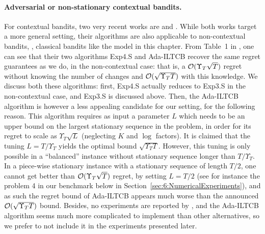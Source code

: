 \paragraph{Adversarial or non-stationary contextual bandits.}
%
For contextual bandits, two very recent works are \cite{Luo18} and \cite{ChenLeeLuoWei2019}.
While both works target a more general setting, their algorithms are also applicable to non-contextual bandits, \ie, classical bandits like the model in this chapter.
From Table~1 in \cite{Luo18}, one can see that their two algorithms Exp4.S and Ada-ILTCB recover the same regret guarantees as we do, in the non-contextual case:
that is, a $\mathcal{O}(\Upsilon_T \sqrt{T})$ regret without knowing the number of changes and $\mathcal{O}(\sqrt{\Upsilon_T T})$ with this knowledge.
We discuss both these algorithms:
%
first, Exp4.S actually reduces to Exp3.S in the non-contextual case, and Exp3.S is discussed above.
%
Then, the Ada-ILTCB algorithm is however a less appealing candidate for our setting, for the following reason.
This algorithm requires as input a parameter $L$ which needs to be an upper bound on the largest stationary sequence in the problem, in order for its regret to scale as $\Upsilon_T \sqrt{L}$ (neglecting $K$ and $\log$ factors).
It is claimed that the tuning $L=T/\Upsilon_T$ yields the optimal bound $\sqrt{\Upsilon_T T}$.
However, this tuning is only possible in a ``balanced'' instance without stationary sequence longer than $T/\Upsilon_T$.
In a piece-wise stationary instance with a stationary sequence of length $T/2$, one cannot get better than $\mathcal{O}(\Upsilon_T \sqrt{T})$ regret, by setting $L=T/2$ (see for instance the problem 4 in our benchmark below in Section~\ref{sec:6:NumericalExperiments}), and as such the regret bound of Ada-ILTCB appears much worse than the announced $\mathcal{O}(\sqrt{\Upsilon_T T})$ bound.
%
Besides, no experiments are reported by \cite{Luo18}, and the Ada-ILTCB algorithm seems much more complicated to implement than other alternatives,
so we prefer to not include it in the experiments presented later.




